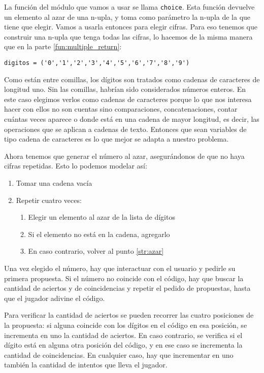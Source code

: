 \begin{enumerate}
La función del módulo que vamos a usar se llama \lstinline!choice!. Esta función
devuelve un elemento al azar de una n-upla, y toma como parámetro la n-upla de
la que tiene que elegir. Vamos a usarla entonces para elegir cifras. Para eso
tenemos que construir una n-upla que tenga todas las cifras, lo hacemos de la
misma manera que en la parte \ref{fun:multiple_return}:

\begin{verbatim}
digitos = ('0','1','2','3','4','5','6','7','8','9')
\end{verbatim}

Como están entre comillas, los dígitos son tratados como cadenas de caracteres
de longitud uno. Sin las comillas, habrían sido considerados números enteros. En
este caso elegimos verlos como cadenas de caracteres porque lo que nos interesa
hacer con ellos no son cuentas sino comparaciones, concatenaciones, contar
cuántas veces aparece o donde está en una cadena de mayor longitud, es decir,
las operaciones que se aplican a cadenas de texto. Entonces que sean
variables de tipo cadena de caracteres es lo que mejor se adapta a nuestro
problema.

Ahora tenemos que generar el número al azar, asegurándonos de que no haya cifras
repetidas. Esto lo podemos modelar así:
\begin{enumerate}
\item Tomar una cadena vacía
\item Repetir cuatro veces:
\begin{enumerate}
\item Elegir un elemento al azar de la lista de dígitos \label{str:azar}
\item Si el elemento no está en la cadena, agregarlo
\item En caso contrario, volver al punto \ref{str:azar}
\end{enumerate}
\end{enumerate}

Una vez elegido el número, hay que interactuar con el usuario y pedirle su
primera propuesta. Si el número no coincide con el código, hay que buscar la
cantidad de aciertos y de coincidencias y repetir el pedido de propuestas, hasta
que el jugador adivine el código.

Para verificar la cantidad de aciertos se pueden recorrer las cuatro posiciones
de la propuesta: si alguna coincide con los dígitos en el código en esa
posición, se incrementa en uno la cantidad de aciertos. En caso contrario, se
verifica si el dígito está en alguna otra posición del código, y en ese caso se
incrementa la cantidad de coincidencias. En cualquier caso, hay que incrementar
en uno también la cantidad de intentos que lleva el jugador.


\end{enumerate}
